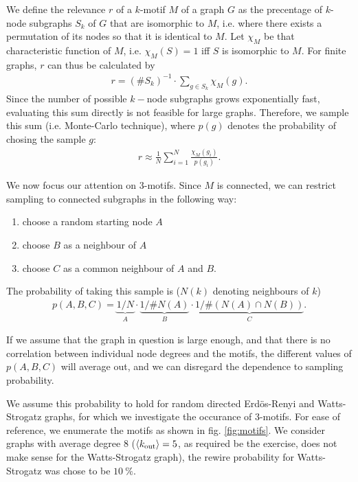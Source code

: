 \documentclass{scrartcl}
\begin{document}
We define the relevance $r$ of a $k$-motif $M$ of a graph $G$ as the
precentage of $k$-node subgraphs $S_k$ of $G$ that are isomorphic to $M$,
i.e. where there exists a permutation of its nodes so that it is identical
to $M$. Let $\chi_M$ be that characteristic function of $M$, i.e.
$\chi_M(S) = 1$ iff $S$ is isomorphic to $M$. 
For finite graphs, $r$ can thus be calculated by 
\begin{align}
 r = (\# S_k)^{-1} \cdot \sum_{g \in S_k} \chi_M (g).
\end{align}
Since the number of possible $k-$node subgraphs grows exponentially fast,
evaluating this sum directly is not feasible for large graphs. Therefore,
we sample this sum (i.e. Monte-Carlo technique), where $p(g)$ denotes the
probability of chosing the sample $g$:
\begin{align}
 r \approx \frac{1}{N} \sum_{i=1}^{N} \frac{\chi_M (g_i)}{p(g_i)}.
\end{align}

We now focus our attention on $3$-motifs. Since $M$ is connected, we can
restrict sampling to connected subgraphs in the following way: 
\begin{enumerate}
\item choose a random starting node $A$ 
\item choose $B$ as a neighbour of $A$
\item choose $C$ as a common neighbour of $A$ and $B$. 
\end{enumerate}
The probability of taking this sample is ($N(k)$ denoting neighbours of $k$)
\begin{align}
 p(A,B,C) = \underbrace{1/N}_{A} \cdot \underbrace{1/\#N(A)}_{B} \cdot \underbrace{1/\#(N(A) \cap N(B))}_{C}.
\end{align}

If we assume that the graph in question is large enough, and that there is
no correlation between individual node degrees and the motifs, the
different values of $p(A,B,C)$ will average out, and we can disregard the
dependence to sampling probability. 

We assume this probability to hold for random directed Erdös-Renyi and
Watts-Strogatz graphs, for which we investigate the occurance of 3-motifs.
For ease of reference, we enumerate the motifs as shown in fig. \ref{fig:motifs}.
We consider graphs with average degree $8$ ($\left< k_{\mathrm{out}} \right> = 5$, as required 
be the exercise, does not make sense for the Watts-Strogatz graph), the rewire
probability for Watts-Strogatz was chose to be $\SI{10}{\percent}$.
\end{document}
